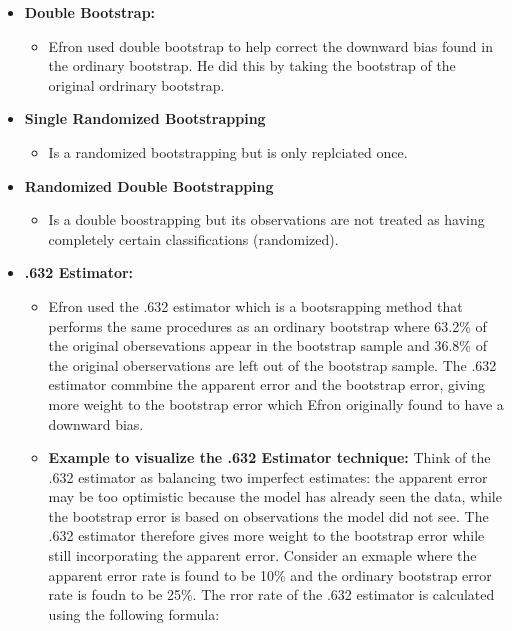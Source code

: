 \documentclass[
  letterpaper,
  DIV=11,
  numbers=noendperiod]{scrreprt}
\providecommand{\tightlist}{%
  \setlength{\itemsep}{0pt}\setlength{\parskip}{0pt}}
\begin{document}
\begin{itemize}
  \begin{itemize}
  \tightlist
  \item
    Efron used a modified version of the ordinary bootstrap which uses
    the same process of an orindary bootstrap but the only idfference is
    that the observations are not treated as having completely certain
    classifications (randomized).
  \end{itemize}
\item
  \textbf{Double Bootstrap:}

  \begin{itemize}
  \tightlist
  \item
    Efron used double bootstrap to help correct the downward bias found
    in the ordinary bootstrap. He did this by taking the bootstrap of
    the original ordrinary bootstrap.
  \end{itemize}
\item
  \textbf{Single Randomized Bootstrapping}

  \begin{itemize}
  \tightlist
  \item
    Is a randomized bootstrapping but is only replciated once.
  \end{itemize}
\item
  \textbf{Randomized Double Bootstrapping}

  \begin{itemize}
  \tightlist
  \item
    Is a double boostrapping but its observations are not treated as
    having completely certain classifications (randomized).
  \end{itemize}
\item
  \textbf{.632 Estimator:}

  \begin{itemize}
  \tightlist
  \item
    Efron used the .632 estimator which is a bootsrapping method that
    performs the same procedures as an ordinary bootstrap where 63.2\%
    of the original obersevations appear in the bootstrap sample and
    36.8\% of the original oberservations are left out of the bootstrap
    sample. The .632 estimator commbine the apparent error and the
    bootstrap error, giving more weight to the bootstrap error which
    Efron originally found to have a downward bias.
  \item
    \textbf{Example to visualize the .632 Estimator technique:} Think of
    the .632 estimator as balancing two imperfect estimates: the
    apparent error may be too optimistic because the model has already
    seen the data, while the bootstrap error is based on observations
    the model did not see. The .632 estimator therefore gives more
    weight to the bootstrap error while still incorporating the apparent
    error. Consider an exmaple where the apparent error rate is found to
    be 10\% and the ordinary bootstrap error rate is foudn to be 25\%.
    The rror rate of the .632 estimator is calculated using the
    following formula:
  \end{itemize}
\end{itemize}
\end{document}
